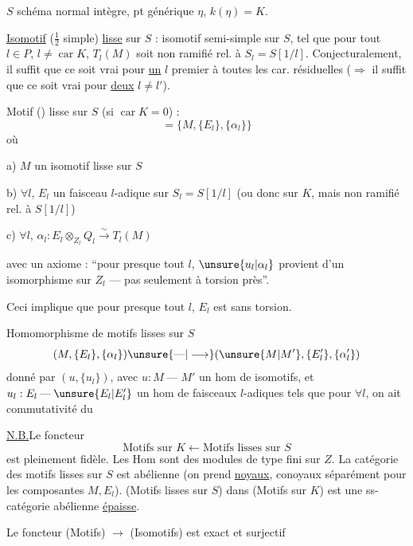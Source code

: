 \(S\) schéma normal intègre, pt générique \(\eta\), \(k(\eta)=K\).

\uline{Isomotif} (\(\frac12\) simple) \uline{lisse} sur \(S\) :
isomotif semi-simple  sur \(S\), tel que pour tout
\(l\in P\), \(l\ne\operatorname{car}K\), \(T_l(M)\) soit non ramifié rel. à
\(S_l=S[1/l]\).
Conjecturalement, il suffit que ce soit vrai pour \uline{un} \(l\)
premier à toutes les car. résiduelles
(\(\Longrightarrow\) il suffit que ce soit vrai pour \uline{deux} \(l\ne l'\)).

Motif () lisse sur \(S\)
(si \(\operatorname{car}K=0\)) :
\[
=\{M,\{E_l\},\{\alpha_l\}\}
\]
où

a) \(M\) un isomotif lisse sur \(S\)

b) \(\forall l\), \(E_l\) un faisceau \(l\)-adique 
sur \(S_l=S[1/l]\) (ou donc sur \(K\), mais non ramifié rel. à \(S[1/l]\))

c) \(\forall l\), \(\alpha_l:E_l\otimes_{Z_l}Q_l\xrightarrow{\sim}T_l(M)\)

avec un axiome : ``pour presque tout \(l\), \(\unsure{u_l|\alpha_l}\)
provient d'un isomorphisme sur \(Z_l\) --- pas seulement à torsion près''.

Ceci implique que pour presque tout \(l\), \(E_l\) est sans torsion.

Homomorphisme de motifs lisses sur \(S\)
\[
(M,\{E_l\},\{\alpha_l\})\unsure{\mathbin{\text{---}}|\longrightarrow}(\unsure{M|M'},\{E'_l\},\{\alpha'_l\})
\]
donné par \((u,\{u_l\})\), avec \(u:M\mathbin{\text{---}}M'\) un hom de
isomotifs,  et \(u_l:E_l\mathbin{\text{---}}\unsure{E_l|E'_l}\) un hom de
faisceaux \(l\)-adiques tels que pour \(\forall l\), on ait commutativité du

\uline{N.B.}\quad Le foncteur 
\[
\text{Motifs sur }K\longleftarrow\text{Motifs lisses sur }S
\]
est pleinement fidèle. Les Hom sont des modules de type fini sur \(Z\).
La catégorie des motifs lisses sur \(S\) est abélienne
(on prend \uline{noyaux}, conoyaux séparément pour les composantes \(M,E_l\)).
 
(Motifs lisses sur \(S\)) dans (Motifs sur \(K\))
est une ss-catégorie abélienne \uline{épaisse}.

Le foncteur (Motifs)
\(\longrightarrow\) (Isomotifs) est exact et surjectif
